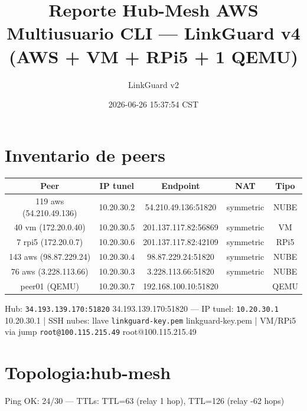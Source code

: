 \documentclass[11pt,a4paper]{article}
\title{Reporte Hub-Mesh AWS Multiusuario CLI — LinkGuard v4 (AWS + VM + RPi5 + 1 QEMU)}
\author{LinkGuard v2}
\date{2026-06-26 15:37:54 CST}
\begin{document}
\maketitle

\section{Inventario de peers}
\begin{longtable}{|c|c|c|c|c|}
\hline
Peer & IP tunel & Endpoint & NAT & Tipo \\ \hline
119 aws (54.210.49.136) & 10.20.30.2 & 54.210.49.136:51820 & symmetric & NUBE \\ \hline
40 vm (172.20.0.40) & 10.20.30.5 & 201.137.117.82:56869 & symmetric & VM \\ \hline
7 rpi5 (172.20.0.7) & 10.20.30.6 & 201.137.117.82:42109 & symmetric & RPi5 \\ \hline
143 aws (98.87.229.24) & 10.20.30.4 & 98.87.229.24:51820 & symmetric & NUBE \\ \hline
76 aws (3.228.113.66) & 10.20.30.3 & 3.228.113.66:51820 & symmetric & NUBE \\ \hline
peer01 (QEMU) & 10.20.30.7 & 192.168.100.10:51820 &  & QEMU \\ \hline
\end{longtable}

Hub:  \texttt{34.193.139.170:51820} 34.193.139.170:51820  — IP tunel:  \texttt{10.20.30.1} 10.20.30.1  | SSH nubes: llave  \texttt{linkguard-key.pem} linkguard-key.pem  | VM/RPi5 via jump  \texttt{root@100.115.215.49} root@100.115.215.49\\

\section{Topologia:hub-mesh}
Ping OK: 24/30 — TTLs: TTL=63 (relay 1 hop), TTL=126 (relay -62 hops)\\
\end{document}
